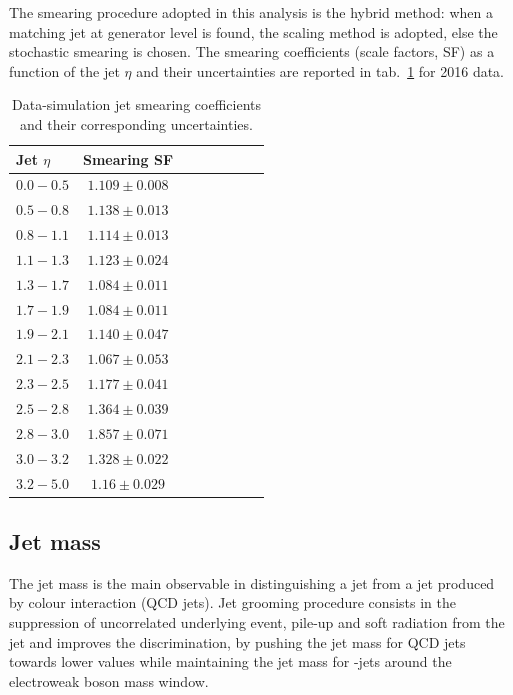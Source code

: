 \noindent The smearing procedure adopted in this analysis is the hybrid method: when a matching jet at generator level is found, the scaling method is adopted, else the stochastic smearing is chosen. The smearing coefficients (scale factors, SF) as a function of the jet $\eta$ and their uncertainties are reported in tab.~\ref{tab:smear} for 2016 data.

\begin{table}[!htb]
  \centering
  \begin{tabular}{l|ccccccc}
    Jet $\eta$ & Smearing SF \\
    \hline
 \hline
    $0.0-0.5$ & $1.109 \pm 0.008$ \\
    $0.5-0.8$ & $1.138 \pm 0.013$ \\
    $0.8-1.1$ & $1.114 \pm 0.013$ \\
    $1.1-1.3$ & $1.123 \pm 0.024$ \\
    $1.3-1.7$ & $1.084 \pm 0.011$ \\
    $1.7-1.9$ & $1.084 \pm 0.011$ \\
    $1.9-2.1$ & $1.140 \pm 0.047$ \\
    $2.1-2.3$ & $1.067 \pm 0.053$ \\
    $2.3-2.5$ & $1.177 \pm 0.041$ \\
    $2.5-2.8$ & $1.364 \pm 0.039$ \\
    $2.8-3.0$ & $1.857 \pm 0.071$ \\
    $3.0-3.2$ & $1.328 \pm 0.022$ \\
    $3.2-5.0$ & $1.16  \pm 0.029$ \\
  \end{tabular}
  
  \caption{Data-simulation jet smearing coefficients and their corresponding uncertainties.}
  \label{tab:smear}
\end{table}

\subsection{Jet mass}\label{ssec:jetmass}

The jet mass is the main observable in distinguishing a \V jet from a jet produced by colour interaction (QCD jets). Jet grooming procedure consists in the suppression of uncorrelated underlying event, pile-up and soft radiation from the jet and improves the discrimination, by pushing the jet mass for QCD jets towards lower values while maintaining the jet mass for \V-jets around the electroweak boson mass window.

